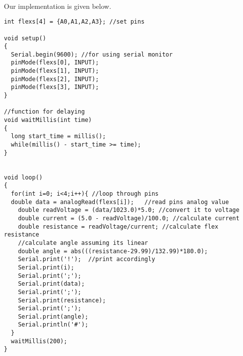 \documentclass[pdftex,12pt,a4paper]{article}
\begin{document}
\begin{flushleft}
\paragraph{}
Our implementation is given below.
\begin{lstlisting}[style={Arduino}]
int flexs[4] = {A0,A1,A2,A3}; //set pins

void setup()
{
  Serial.begin(9600); //for using serial monitor
  pinMode(flexs[0], INPUT);
  pinMode(flexs[1], INPUT);
  pinMode(flexs[2], INPUT);
  pinMode(flexs[3], INPUT);
}

//function for delaying
void waitMillis(int time)
{
  long start_time = millis();
  while(millis() - start_time >= time);
}

 
void loop()
{
  for(int i=0; i<4;i++){ //loop through pins
  double data = analogRead(flexs[i]);	//read pins analog value
    double readVoltage = (data/1023.0)*5.0;	//convert it to voltage
    double current = (5.0 - readVoltage)/100.0; //calculate current
    double resistance = readVoltage/current; //calculate flex resistance
    //calculate angle assuming its linear
    double angle = abs(((resistance-29.99)/132.99)*180.0); 
    Serial.print('!');	//print accordingly
    Serial.print(i);
    Serial.print(';');
    Serial.print(data);
    Serial.print(';');
    Serial.print(resistance);
    Serial.print(';');
    Serial.print(angle);
    Serial.println('#');
  }
  waitMillis(200);
}
\end{lstlisting}
\end{flushleft}
\end{document}
